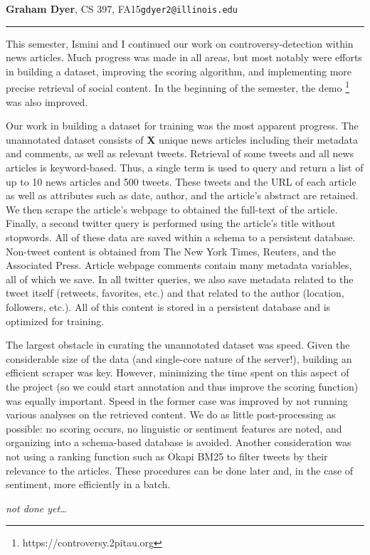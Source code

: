 \documentclass{article}[12pt]
\begin{document}
\noindent\textbf{Graham Dyer}, CS 397, FA15\hfill{\tt{gdyer2}\tt{@}\tt{illinois}\tt{.}\tt{edu}}
\hrule
\vspace{5mm}
This semester, Ismini and I continued our work on controversy-detection within news articles. Much progress was made in all areas, but most notably were efforts in building a dataset, improving the scoring algorithm, and implementing more precise retrieval of social content. In the beginning of the semester, the demo \footnote{https://controversy.2pitau.org} was also improved.

Our work in building a dataset for training was the most apparent progress. The unannotated dataset consists of \textbf{X} unique news articles including their metadata and comments, as well as relevant tweets. Retrieval of some tweets and all news articles is keyword-based. Thus, a single term is used to query and return a list of up to 10 news articles and 500 tweets. These tweets and the URL of each article as well as attributes such as date, author, and the article's abstract are retained. We then scrape the article's webpage to obtained the full-text of the article. Finally, a second twitter query is performed using the article's title without stopwords. All of these data are saved within a schema to a persistent database. Non-tweet content is obtained from The New York Times, Reuters, and the Associated Press. Article webpage comments contain many metadata variables, all of which we save. In all twitter queries, we also save metadata related to the tweet itself (retweets, favorites, etc.) and that related to the author (location, followers, etc.). All of this content is stored in a persistent database and is optimized for training.

The largest obstacle in curating the unannotated dataset was speed. Given the considerable size of the data (and single-core nature of the server!), building an efficient scraper was key. However, minimizing the time spent on this aspect of the project (so we could start annotation and thus improve the scoring function) was equally important. Speed in the former case was improved by not running various analyses on the retrieved content. We do as little post-processing as possible: no scoring occurs, no linguistic or sentiment features are noted, and organizing into a schema-based database is avoided. Another consideration was not using a ranking function such as Okapi BM25 to filter tweets by their relevance to the articles. These procedures can be done later and, in the case of sentiment, more efficiently in a batch.

\textit{not done yet\ldots}
\end{document}
